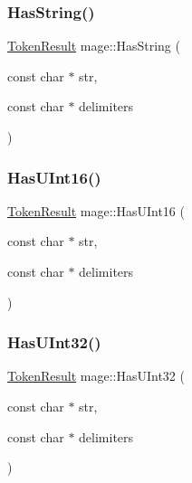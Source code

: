 \hypertarget{namespacemage_aee4453ab304c7abc50f3b6f8ff53ce19}{}\label{namespacemage_aee4453ab304c7abc50f3b6f8ff53ce19} 
\subsubsection{\texorpdfstring{Has\+String()}{HasString()}}
{\footnotesize\ttfamily \hyperlink{namespacemage_a2178ba2411db5912f41b2e7698c2037d}{Token\+Result} mage\+::\+Has\+String (\begin{DoxyParamCaption}\item[{const char $\ast$}]{str,  }\item[{const char $\ast$}]{delimiters }\end{DoxyParamCaption})}

\hypertarget{namespacemage_a1dd9c4b40b7b0e084a3014f8fd9f26ca}{}\label{namespacemage_a1dd9c4b40b7b0e084a3014f8fd9f26ca} 
\subsubsection{\texorpdfstring{Has\+U\+Int16()}{HasUInt16()}}
{\footnotesize\ttfamily \hyperlink{namespacemage_a2178ba2411db5912f41b2e7698c2037d}{Token\+Result} mage\+::\+Has\+U\+Int16 (\begin{DoxyParamCaption}\item[{const char $\ast$}]{str,  }\item[{const char $\ast$}]{delimiters }\end{DoxyParamCaption})}

\hypertarget{namespacemage_a2b7625293b098b935d6fe3b251573018}{}\label{namespacemage_a2b7625293b098b935d6fe3b251573018} 
\subsubsection{\texorpdfstring{Has\+U\+Int32()}{HasUInt32()}}
{\footnotesize\ttfamily \hyperlink{namespacemage_a2178ba2411db5912f41b2e7698c2037d}{Token\+Result} mage\+::\+Has\+U\+Int32 (\begin{DoxyParamCaption}\item[{const char $\ast$}]{str,  }\item[{const char $\ast$}]{delimiters }\end{DoxyParamCaption})}

